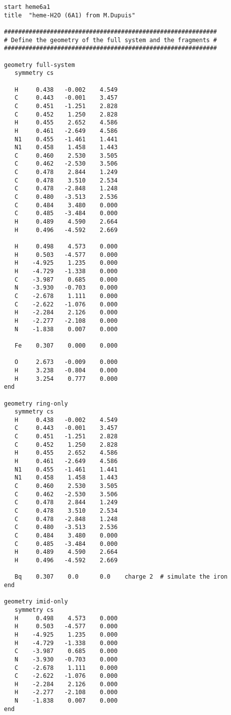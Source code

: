 \begin{verbatim}
start heme6a1
title  "heme-H2O (6A1) from M.Dupuis"

############################################################
# Define the geometry of the full system and the fragments #
############################################################

geometry full-system
   symmetry cs

   H     0.438   -0.002    4.549
   C     0.443   -0.001    3.457
   C     0.451   -1.251    2.828
   C     0.452    1.250    2.828
   H     0.455    2.652    4.586
   H     0.461   -2.649    4.586
   N1    0.455   -1.461    1.441
   N1    0.458    1.458    1.443
   C     0.460    2.530    3.505
   C     0.462   -2.530    3.506
   C     0.478    2.844    1.249
   C     0.478    3.510    2.534
   C     0.478   -2.848    1.248
   C     0.480   -3.513    2.536
   C     0.484    3.480    0.000
   C     0.485   -3.484    0.000
   H     0.489    4.590    2.664
   H     0.496   -4.592    2.669

   H     0.498    4.573    0.000
   H     0.503   -4.577    0.000
   H    -4.925    1.235    0.000
   H    -4.729   -1.338    0.000
   C    -3.987    0.685    0.000
   N    -3.930   -0.703    0.000
   C    -2.678    1.111    0.000
   C    -2.622   -1.076    0.000
   H    -2.284    2.126    0.000
   H    -2.277   -2.108    0.000
   N    -1.838    0.007    0.000

   Fe    0.307    0.000    0.000

   O     2.673   -0.009    0.000
   H     3.238   -0.804    0.000
   H     3.254    0.777    0.000
end

geometry ring-only
   symmetry cs
   H     0.438   -0.002    4.549
   C     0.443   -0.001    3.457
   C     0.451   -1.251    2.828
   C     0.452    1.250    2.828
   H     0.455    2.652    4.586
   H     0.461   -2.649    4.586
   N1    0.455   -1.461    1.441
   N1    0.458    1.458    1.443
   C     0.460    2.530    3.505
   C     0.462   -2.530    3.506
   C     0.478    2.844    1.249
   C     0.478    3.510    2.534
   C     0.478   -2.848    1.248
   C     0.480   -3.513    2.536
   C     0.484    3.480    0.000
   C     0.485   -3.484    0.000
   H     0.489    4.590    2.664
   H     0.496   -4.592    2.669

   Bq    0.307    0.0      0.0    charge 2  # simulate the iron
end

geometry imid-only
   symmetry cs
   H     0.498    4.573    0.000
   H     0.503   -4.577    0.000
   H    -4.925    1.235    0.000
   H    -4.729   -1.338    0.000
   C    -3.987    0.685    0.000
   N    -3.930   -0.703    0.000
   C    -2.678    1.111    0.000
   C    -2.622   -1.076    0.000
   H    -2.284    2.126    0.000
   H    -2.277   -2.108    0.000
   N    -1.838    0.007    0.000
end


\end{verbatim}
